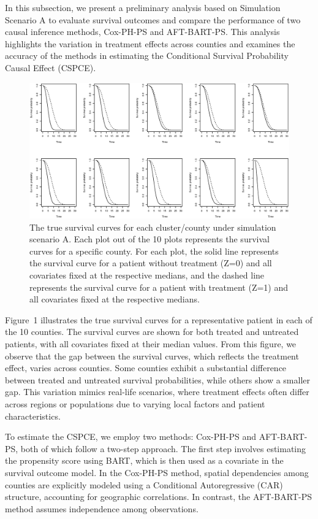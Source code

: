 \documentclass[useAMS,referee]{biom}
\begin{document}
In this subsection, we present a preliminary analysis based on Simulation Scenario A to evaluate survival outcomes and compare the performance of two causal inference methods, Cox-PH-PS and AFT-BART-PS. This analysis highlights the variation in treatment effects across counties and examines the accuracy of the methods in estimating the Conditional Survival Probability Causal Effect (CSPCE).
\begin{figure}
    \centering
    \includegraphics[width=1.05\linewidth]{pics/Countyswise_true_survival_sim_A.eps}
    \caption{The true survival curves for each cluster/county under simulation scenario A. Each plot out of the 10 plots represents the survival curves for a specific county. For each plot, the solid line represents the survival curve for a patient without treatment (Z=0) and all covariates fixed at the respective medians, and the dashed line represents the survival curve for a patient with treatment (Z=1) and all covariates fixed at the respective medians.}
    \label{fig:TruesurvA}
\end{figure}
Figure~1 illustrates the true survival curves for a representative patient in each of the 10 counties. The survival curves are shown for both treated and untreated patients, with all covariates fixed at their median values. From this figure, we observe that the gap between the survival curves, which reflects the treatment effect, varies across counties. Some counties exhibit a substantial difference between treated and untreated survival probabilities, while others show a smaller gap. This variation mimics real-life scenarios, where treatment effects often differ across regions or populations due to varying local factors and patient characteristics.

To estimate the CSPCE, we employ two methods: Cox-PH-PS and AFT-BART-PS, both of which follow a two-step approach. The first step involves estimating the propensity score using BART, which is then used as a covariate in the survival outcome model. In the Cox-PH-PS method, spatial dependencies among counties are explicitly modeled using a Conditional Autoregressive (CAR) structure, accounting for geographic correlations. In contrast, the AFT-BART-PS method assumes independence among observations.
\end{document}
